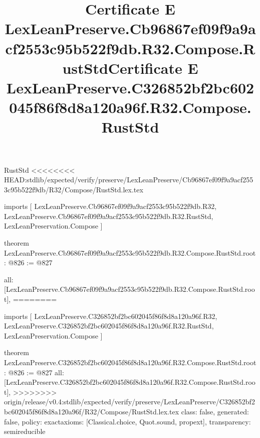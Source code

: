 \begin{lexlean}{RustStd}
<<<<<<<< HEAD:stdlib/expected/verify/preserve/LexLeanPreserve/Cb96867ef09f9a9acf2553c95b522f9db/R32/Compose/RustStd.lex.tex
\title{Certificate E LexLeanPreserve.Cb96867ef09f9a9acf2553c95b522f9db.R32.Compose.RustStd}
\begin{coremodule}
imports [
  LexLeanPreserve.Cb96867ef09f9a9acf2553c95b522f9db.R32,
  LexLeanPreserve.Cb96867ef09f9a9acf2553c95b522f9db.R32.RustStd,
  LexLeanPreservation.Compose
]

theorem LexLeanPreserve.Cb96867ef09f9a9acf2553c95b522f9db.R32.Compose.RustStd.root : @826 := @827 {
  all: [LexLeanPreserve.Cb96867ef09f9a9acf2553c95b522f9db.R32.Compose.RustStd.root],
========
\title{Certificate E LexLeanPreserve.C326852bf2bc602045f86f8d8a120a96f.R32.Compose.RustStd}
\begin{coremodule}
imports [
  LexLeanPreserve.C326852bf2bc602045f86f8d8a120a96f.R32,
  LexLeanPreserve.C326852bf2bc602045f86f8d8a120a96f.R32.RustStd,
  LexLeanPreservation.Compose
]

theorem LexLeanPreserve.C326852bf2bc602045f86f8d8a120a96f.R32.Compose.RustStd.root : @826 := @827 {
  all: [LexLeanPreserve.C326852bf2bc602045f86f8d8a120a96f.R32.Compose.RustStd.root],
>>>>>>>> origin/release/v0.4:stdlib/expected/verify/preserve/LexLeanPreserve/C326852bf2bc602045f86f8d8a120a96f/R32/Compose/RustStd.lex.tex
  class: false,
  generated: false,
  policy: exact{axioms: [Classical.choice, Quot.sound, propext]},
  transparency: semireducible
}


\end{coremodule}}
\end{coremodule}
\end{lexlean}
